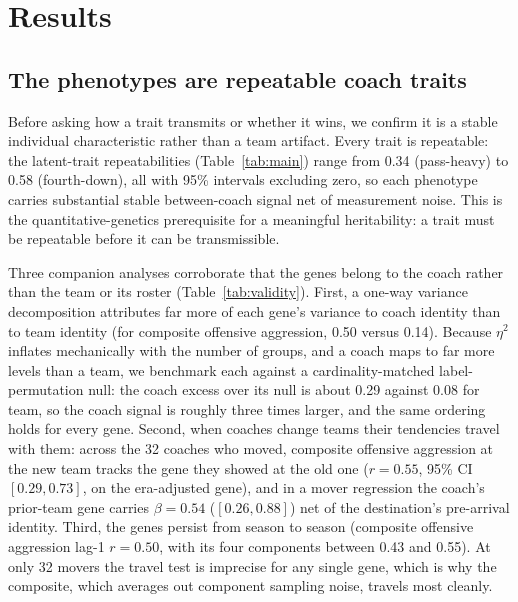 \documentclass[
  journal=ehs,
  manuscript=article,
  year=2026,
  volume=8,
]{cup-journal}
\begin{document}
\section{Results}

\subsection{The phenotypes are repeatable coach traits}
Before asking how a trait transmits or whether it wins, we confirm it is a stable
individual characteristic rather than a team artifact. Every trait is repeatable:
the latent-trait repeatabilities (Table~\ref{tab:main}) range from 0.34
(pass-heavy) to 0.58 (fourth-down), all with 95\% intervals excluding zero, so each phenotype
carries substantial stable between-coach signal net of measurement noise. This is
the quantitative-genetics prerequisite for a meaningful heritability: a trait must
be repeatable before it can be transmissible.

Three companion analyses corroborate that the genes belong to the coach rather than
the team or its roster (Table~\ref{tab:validity}). First, a one-way variance
decomposition attributes far more of each gene's variance to coach identity than to
team identity (for composite offensive aggression, 0.50 versus 0.14). Because
$\eta^2$ inflates mechanically with the number of groups, and a coach maps to far
more levels than a team, we benchmark each against a cardinality-matched
label-permutation null: the coach excess over its null is about 0.29 against 0.08 for
team, so the coach signal is roughly three times larger, and the same ordering holds
for every gene. Second, when coaches change teams their tendencies travel with them:
across the 32 coaches who moved, composite offensive aggression at the new team
tracks the gene they showed at the old one ($r=0.55$, 95\% CI $[0.29,0.73]$, on the
era-adjusted gene), and in a mover regression the coach's prior-team gene carries
$\beta=0.54$ ($[0.26,0.88]$) net of the destination's pre-arrival identity. Third,
the genes persist from season to season (composite offensive aggression lag-1
$r=0.50$, with its four components between 0.43 and 0.55). At only 32 movers the
travel test is imprecise for any single gene, which is why the composite, which
averages out component sampling noise, travels most cleanly.
\end{document}
